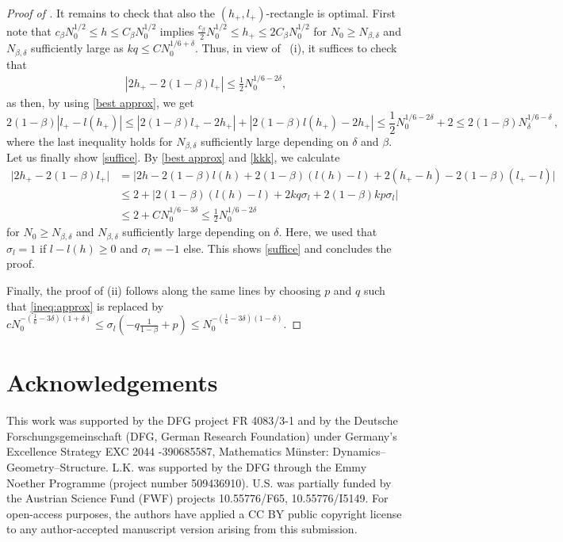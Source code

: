 \documentclass[reqno]{amsart}
\theoremstyle{plain}
\theoremstyle{definition}
\numberwithin{equation}{section}
\begin{document}
\begin{proof}[Proof of ]
It remains to check that also the   $(h_+, l_+)$-rectangle is optimal. First note that  $ c_\beta N_0^{1/2} \le h \le  C_\beta  N_0^{1/2} $ implies $\frac{c_\beta}{2} N_0^{1/2} \le h_+ \le 2C_\beta N_0^{1/2} $ for $N_0 \ge N_{\beta,\delta} $ and $ N_{\beta,\delta} $ sufficiently large as $kq \le  C N_0^{1/6+\delta}$.   Thus,  in  view of ~(i),  it suffices to check that  
\begin{align}\label{suffice}
|2 h_+ - 2(1-\beta)  l_+| \le  \frac{1}{2}N_0^{1/6- 2    \delta}, 
\end{align}
as then, by using \eqref{best approx}, we get
$$    2(1-\beta)    |l_+ - l(h_+)| \le | 2(1-\beta)  l_+ - 2h_+| +   |
2(1-\beta)  l(h_+) - 2h_+| \le  \frac{1}{2}N_0^{1/6-  2   \delta}
+2\le   2(1-\beta)   N_{ \delta}^{1/6-\delta}\,,    $$
where the last inequality holds for $ N_{\beta,\delta} $ sufficiently large depending on $\delta$ and $\beta$. 
Let us finally  show \eqref{suffice}. By \eqref{best approx} and \eqref{kkk}, we calculate
\begin{align*}
\big|2 h_+ - 2(1-\beta)  l_+\big| & =   \big|2 h - 2(1-\beta)  l(h)    + 2(1-\beta)  (l(h) - l) + 2 (h_+ -  h)   -  2(1-\beta)  (l_+-l) \big| \\
& \le 2 +  \big| 2(1-\beta) (l(h) - l) + 2kq  \sigma_l   + 2(1-\beta) kp  \sigma_l   \big|  \\ 
& \le 2 + CN_0^{1/6- 3  \delta} \le \frac{1}{2}N_0^{1/6 -  2    \delta}  
\end{align*}
for $N_0\ge N_{\beta,\delta} $ and $ N_{\beta,\delta} $ sufficiently large depending on $\delta$. Here, we used that $\sigma_l = 1$ if $l- l(h)\ge 0$ and $\sigma_l = -1$ else.   This shows \eqref{suffice} and concludes the proof.

 Finally, the proof of (ii) follows along the same lines by choosing $p$ and $q$ such that \eqref{ineq:approx} is replaced by  $c N_0^{-(\frac{1}{6}-3\delta)(1+\delta)} \leq   \sigma_l  ( -q \frac{1}{1-\beta}      + p ) \leq N_0^{-(\frac{1}{6}-3\delta)(1-\delta)}$.   
\end{proof}
  



\section*{Acknowledgements} 
This work was supported by the DFG project FR 4083/3-1 and by the
Deutsche Forschungsgemeinschaft (DFG, German Research Foundation)
under Germany's Excellence Strategy EXC 2044 -390685587, Mathematics
M\"unster: Dynamics--Geometry--Structure. L.K. was supported by the
DFG through the Emmy Noether Programme (project number
509436910). U.S.  was partially funded by the Austrian Science Fund (FWF) projects 10.55776/F65,  10.55776/I5149. For
open-access purposes, the authors have applied a CC BY public copyright
license to any author-accepted manuscript version arising from this
submission. 
\end{document}
